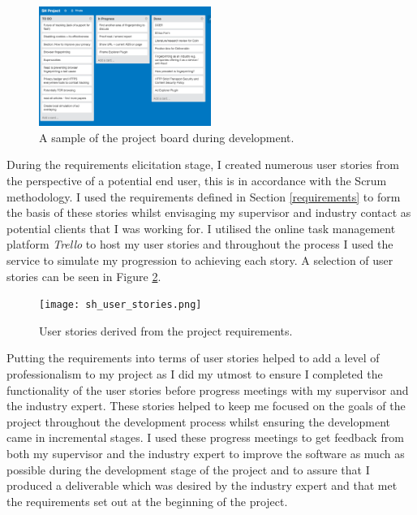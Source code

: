 \documentclass[12pt]{article}
\begin{document}
\begin{figure}[H]
    \centering
    \includegraphics[width=0.5\textwidth]{Project_Board.png}
    \caption{A sample of the project board during development.}
    \label{fig:Project_Board}
\end{figure}

During the requirements elicitation stage, I created numerous user stories from the perspective of a potential end user, this is in accordance with the Scrum methodology. I used the requirements defined in Section \ref{requirements} to form the basis of these stories whilst envisaging my supervisor and industry contact as potential clients that I was working for. I utilised the online task management platform \textit{Trello} to host my user stories and throughout the process I used the service to simulate my progression to achieving each story. A selection of user stories can be seen in Figure \ref{fig:sh_user_stories}.

\begin{figure}[H]
    \centering
    \texttt{[image: sh\_user\_stories.png]}
    \caption{User stories derived from the project requirements.}
    \label{fig:sh_user_stories}
\end{figure}

Putting the requirements into terms of user stories helped to add a level of professionalism to my project as I did my utmost to ensure I completed the functionality of the user stories before progress meetings with my supervisor and the industry expert. These stories helped to keep me focused on the goals of the project throughout the development process whilst ensuring the development came in incremental stages. I used these progress meetings to get feedback from both my supervisor and the industry expert to improve the software as much as possible during the development stage of the project and to assure that I produced a deliverable which was desired by the industry expert and that met the requirements set out at the beginning of the project. \\
\end{document}
